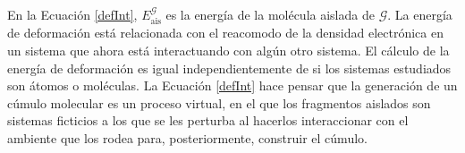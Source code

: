 En la Ecuación \ref{defInt}, $E^{\mathscr{G}}_{\mathrm{ais}}$ es la energía de
la molécula aislada de $\mathscr{G}$. La energía de deformación está
relacionada con el reacomodo de la densidad electrónica en un sistema que ahora
está interactuando con algún otro sistema. El cálculo de la energía de
deformación es igual independientemente de si los sistemas estudiados son
átomos o moléculas. La Ecuación \ref{defInt} hace pensar que la generación de
un cúmulo molecular es un proceso virtual, en el que los fragmentos aislados
son sistemas ficticios a los que se les perturba al hacerlos interaccionar con
el ambiente que los rodea para, posteriormente, construir el  cúmulo. 

